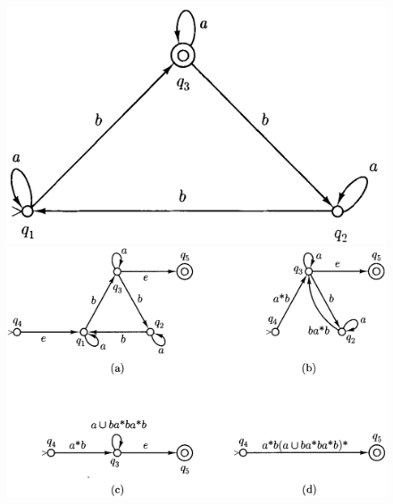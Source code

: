 \begin{figure}[t]
  \centering
  \begin{minipage}{.35\textwidth}
    \centering
    \includegraphics[width=\textwidth]{img/Fig2.15.png}
    \caption{}
  \end{minipage}
  \begin{minipage}{.43\textwidth}
    \centering
    \includegraphics[width=\textwidth]{img/Fig2.16.png}
    \caption{}
  \end{minipage}
\end{figure}

